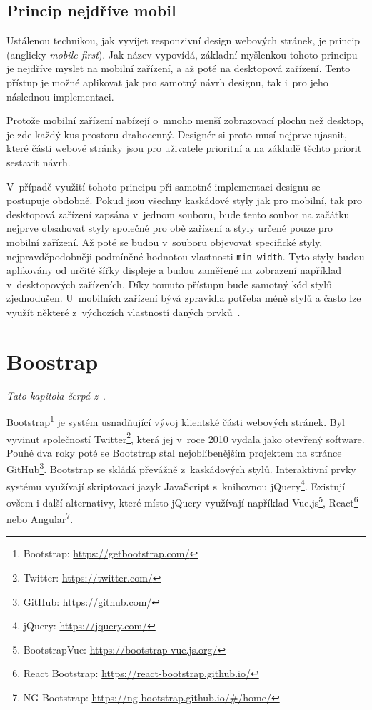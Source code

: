 \subsection{Princip nejdříve mobil}\label{section:mobile-first}
Ustálenou technikou, jak vyvíjet responzivní design webových stránek, je princip  (anglicky \emph{mobile-first}). Jak název vypovídá, základní myšlenkou tohoto principu je nejdříve myslet na mobilní zařízení, a až poté na desktopová zařízení. Tento přístup je možné aplikovat jak pro samotný návrh designu, tak i~pro jeho následnou implementaci.

Protože mobilní zařízení nabízejí o~mnoho menší zobrazovací plochu než desktop, je zde každý kus prostoru drahocenný. Designér si proto musí nejprve ujasnit, které části webové stránky jsou pro uživatele prioritní a na základě těchto priorit sestavit návrh.

V~případě využití tohoto principu při samotné implementaci designu se postupuje obdobně. Pokud jsou všechny kaskádové styly jak pro mobilní, tak pro desktopová zařízení zapsána v~jednom souboru, bude tento soubor na začátku nejprve obsahovat styly společné pro obě zařízení a styly určené pouze pro mobilní zařízení. Až poté se budou v~souboru objevovat specifické styly, nejpravděpodobněji podmíněné hodnotou vlastnosti \texttt{min-width}. Tyto styly budou aplikovány od určité šířky displeje a budou zaměřené na zobrazení například v~desktopových zařízeních. Díky tomuto přístupu bude samotný kód stylů zjednodušen. U~mobilních zařízení bývá zpravidla potřeba méně stylů a často lze využít některé z~výchozích vlastností daných prvků~\cite{bib:mobile-first}.


\section{Boostrap}
\emph{Tato kapitola čerpá z~\cite{bib:bootstrap}}.

Bootstrap\footnote{Bootstrap: \url{https://getbootstrap.com/}} je systém usnadňující vývoj klientské části webových stránek. Byl vyvinut společností Twitter\footnote{Twitter: \url{https://twitter.com/}}, která jej v~roce 2010 vydala jako otevřený software. Pouhé dva roky poté se Bootstrap stal nejoblíbenějším projektem na stránce GitHub\footnote{GitHub: \url{https://github.com/}}. Bootstrap se skládá převážně z~kaskádových stylů. Interaktivní prvky systému využívají skriptovací jazyk JavaScript s~knihovnou jQuery\footnote{jQuery: \url{https://jquery.com/}}. Existují ovšem i další alternativy, které místo jQuery využívají například Vue.js\footnote{BootstrapVue: \url{https://bootstrap-vue.js.org/}}, React\footnote{React Bootstrap: \url{https://react-bootstrap.github.io/}} nebo Angular\footnote{NG Bootstrap: \url{https://ng-bootstrap.github.io/\#/home/}}.

